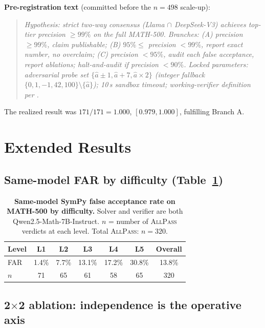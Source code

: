 \documentclass{article}
\begin{document}
\textbf{Pre-registration text} (committed before the $n{=}498$ scale-up):
\begin{quote}\itshape\small
Hypothesis: strict two-way consensus (Llama $\cap$ DeepSeek-V3) achieves top-tier precision $\geq 99\%$ on the full MATH-500. Branches: (A) precision $\geq 99\%$, claim publishable; (B) $95\%\leq$ precision $<99\%$, report exact number, no overclaim; (C) precision $<95\%$, audit each false acceptance, report ablations; halt-and-audit if precision $<90\%$. Locked parameters: adversarial probe set $\{\hat a\pm 1, \hat a+7, \hat a\times 2\}$ (integer fallback $\{0,1,-1,42,100\}\setminus\{\hat a\}$); 10\,s sandbox timeout; working-verifier definition per .
\end{quote}
The realized result was $171/171 = 1.000$, $[0.979, 1.000]$, fulfilling Branch A.

\section{Extended Results}
\label{app:results}

\subsection{Same-model FAR by difficulty (Table~\ref{tab:far})}

\begin{table}[h]
\centering
\caption{\textbf{Same-model SymPy false acceptance rate on MATH-500 by difficulty.} Solver and verifier are both Qwen2.5-Math-7B-Instruct. $n$ = number of \textsc{AllPass} verdicts at each level. Total \textsc{AllPass}: $n=320$.}
\label{tab:far}
\small
\begin{tabular}{lcccccc}
\toprule
Level & L1 & L2 & L3 & L4 & L5 & Overall \\
\midrule
FAR   & 1.4\% & 7.7\% & 13.1\% & 17.2\% & 30.8\% & 13.8\% \\
$n$   & 71    & 65    & 61     & 58     & 65     & 320 \\
\bottomrule
\end{tabular}
\end{table}

\subsection{2$\times$2 ablation: independence is the operative axis}
\end{document}
